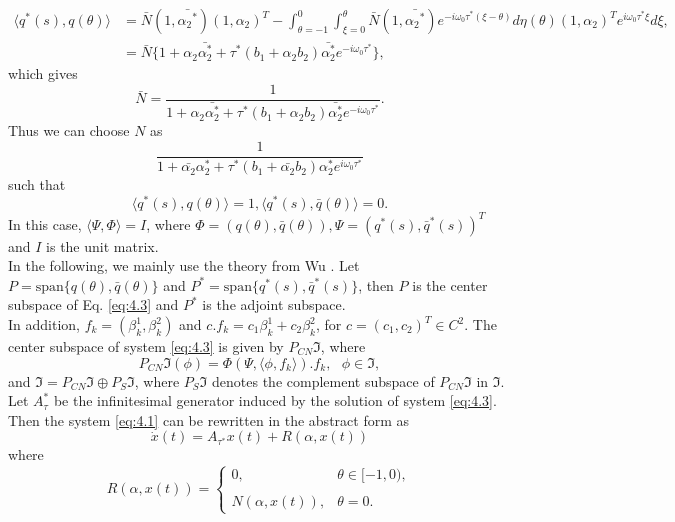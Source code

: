 \documentclass[10pt]{amsart}
\theoremstyle{definition}
\begin{document}
\begin{align*}
\langle q^*(s) ,q(\theta)  \rangle
&= \bar N (1,\bar {{\alpha_2}^*})(1,\alpha_2)^T
-\int_{\theta = -1}^{0} \int_{\xi = 0}^{\theta} \bar N (1,\bar {{\alpha_2}^*}) e^{-i\omega_0 \tau^* (\xi -
\theta)} d \eta (\theta) (1,\alpha_2)^T  e^{i\omega_0 \tau^* \xi} d \xi ,\\
&=\bar N \{ 1 + \alpha_2 \bar{\alpha_2^*} + \tau^*  (b_1 +\alpha_2b_2)\bar{\alpha_2^*}e^{-i\omega_0 \tau^*} \},
\end{align*}
which gives
$$\bar N=\frac{1}{1 + \alpha_2 \bar{\alpha_2^*} + \tau^*(b_1+\alpha_2b_2)\bar{\alpha_2^*}e^{-i\omega_0 \tau^*}}.$$
Thus we can choose $N$ as
$$\frac{1}{1 + \bar{\alpha_2} {\alpha_2^*} + \tau^*(b_1+\bar{\alpha_2}b_2){\alpha_2^*}e^{i\omega_0 \tau^*}}$$
such that
$$\langle q^*(s) ,q(\theta)  \rangle =1, \langle q^*(s) ,\bar {q}(\theta)  \rangle=0.$$
In this case, $\langle \Psi,\Phi \rangle=I$, where $\Phi=(q(\theta),\bar{q}(\theta)), \Psi=(q^*(s),{\bar{q}}^*(s))^T$ and $I$ is the unit matrix.\\
In the following, we mainly use the theory from Wu \cite{WU96}. Let $P=\mbox{span}\{q(\theta),\bar{q}(\theta)\}$ and $P^*=\mbox{span}\{q^*(s),{\bar{q}}^*(s)\}$, then $P$ is the center subspace of Eq. \eqref{eq:4.3} and $P^*$ is the adjoint subspace.\\
In addition, $f_k=(\beta_k^1,\beta_k^2)$ and $c.f_k=c_1\beta_k^1+c_2\beta_k^2$, for $c=(c_1,c_2)^T\in C^2$. The center subspace of system \eqref{eq:4.3} is given by $P_{CN}\Im$, where
\begin{equation}\label{eq:4.12}
P_{CN}\Im (\phi)=\Phi(\Psi,\langle \phi,f_k\rangle).f_k,~~~\phi \in \Im,
\end{equation}
and $\Im=P_{CN}\Im\oplus P_S \Im$, where $P_S \Im$ denotes the complement subspace of $P_{CN} \Im$ in $\Im$. Let $A_{\tau}^*$ be the infinitesimal generator induced by the solution of system \eqref{eq:4.3}. Then the system \eqref{eq:4.1} can be rewritten in the abstract form as
$$\dot{x}(t)=A_{\tau^*}x(t)+R(\alpha,x(t))$$
where
$$R(\alpha,x(t))=\left\{\begin{array}{ll}0,& \theta \in [-1,0), \\
 \\ N(\alpha,x(t)),& \theta=0. \end{array}\right. $$
\end{document}
